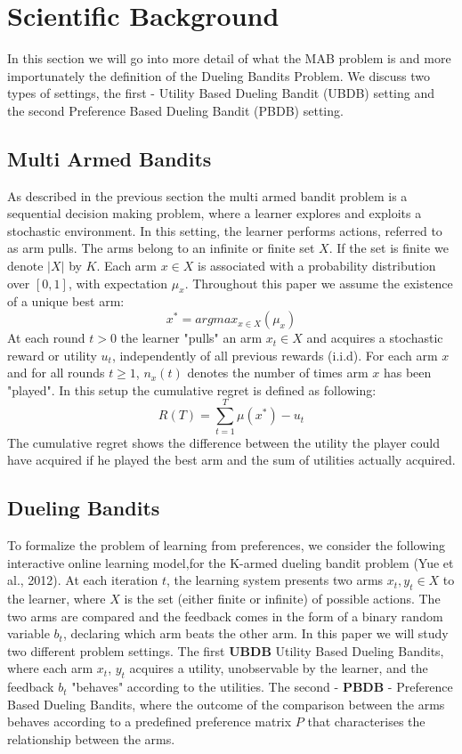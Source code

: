 \documentclass{llncs}
\begin{document}
\section{Scientific Background}
	In this section we will go into more detail of what the MAB problem is and more importunately the definition of the Dueling Bandits Problem. 
	We discuss two types of settings, the first - Utility Based Dueling Bandit (UBDB) setting and the second Preference Based Dueling Bandit (PBDB) setting.
	\subsection{Multi Armed Bandits}
	As described in the previous section the multi armed bandit problem is a sequential decision making problem, where a learner explores and exploits a stochastic environment. 
	In this setting, the learner performs actions, referred to as arm pulls. 
	The arms belong to an infinite or finite set $X$. 
	If the set is finite we denote $|X|$ by $K$. 
	Each arm $x \in X$ is associated with a probability distribution over $[0, 1]$, with expectation $\mu_{x}$. 
	Throughout this paper we assume the existence of a unique best arm:
	\begin{equation}\label{eq:regret}
		x^* = argmax_{x \in X}(\mu_{x})
	\end{equation}		
	At each round $t > 0$ the learner "pulls" an arm $x_t \in X$ and acquires a stochastic reward or utility $u_t$, independently of all previous rewards (i.i.d). 
	For each arm $x$ and for all rounds $t \geq 1$,  $n_{x}(t)$ denotes the number of times arm $x$ has been "played".
	In this setup the cumulative regret is defined as following:
	\begin{equation}\label{eq:regret}
		R(T) = \sum_{t=1}^{T} \mu(x^*) - u_t
	\end{equation}
	The cumulative regret shows the difference between the utility the player could have acquired if he played the best arm and the sum of utilities actually acquired.
	\subsection{Dueling Bandits}
		To formalize the problem of learning from preferences, we consider the following interactive online learning model,for the K-armed dueling bandit problem (Yue et al., 2012).
		At each iteration $t$, the learning system presents two arms $x_t, y_t \in X$ to the learner, where $X$ is the set (either finite or infinite) of possible actions. The two arms are compared and the feedback comes in the form of a binary random variable $b_t$, declaring which arm beats the other arm.
		In this paper we will study two different problem settings.
		The first \textbf{UBDB} Utility Based Dueling Bandits, where each arm $x_t$, $y_t$ acquires a utility, unobservable by the learner, and the feedback $b_t$ "behaves" according to the utilities. 
		The second - \textbf{PBDB} - Preference Based Dueling Bandits, where the outcome of the comparison between the arms behaves according to a predefined preference matrix $P$ that characterises the relationship between the arms.
\end{document}
